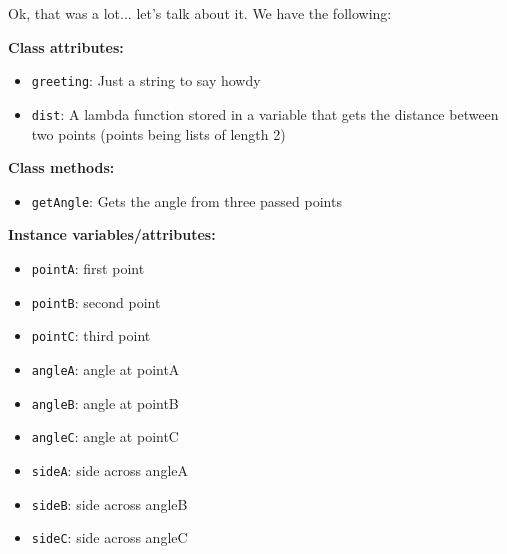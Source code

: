 \documentclass[11pt, twoside, reqno]{book}
\begin{document}
Ok, that was a lot... let's talk about it. We have the following:

\textbf{Class attributes:}
\begin{itemize} \item \texttt{greeting}: Just a string to say howdy\end{itemize}
\begin{itemize} \item \texttt{dist}: A lambda function stored in a variable that gets the distance between two points (points being lists of length 2)\end{itemize}

\textbf{Class methods:}
\begin{itemize} \item \texttt{getAngle}: Gets the angle from three passed points\end{itemize}

\textbf{Instance variables/attributes:}
\begin{itemize} \item \texttt{pointA}: first point\end{itemize}
\begin{itemize} \item \texttt{pointB}: second point\end{itemize}
\begin{itemize} \item \texttt{pointC}: third point\end{itemize}
\begin{itemize} \item \texttt{angleA}: angle at pointA\end{itemize}
\begin{itemize} \item \texttt{angleB}: angle at pointB\end{itemize}
\begin{itemize} \item \texttt{angleC}: angle at pointC\end{itemize}
\begin{itemize} \item \texttt{sideA}: side across angleA\end{itemize}
\begin{itemize} \item \texttt{sideB}: side across angleB\end{itemize}
\begin{itemize} \item \texttt{sideC}: side across angleC\end{itemize}
\end{document}
